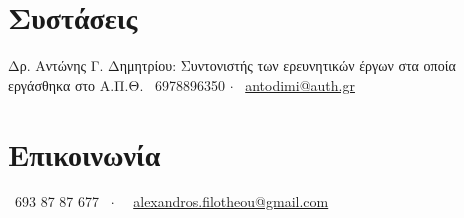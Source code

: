 \documentclass[a4paper,10pt,twoside]{article}
\begin{document}
\section{Συστάσεις}
Δρ. Αντώνης Γ. Δημητρίου: Συντονιστής των ερευνητικών έργων στα οποία εργάσθηκα στο Α.Π.Θ. \hspace{1cm}
\faPhone \ 6978896350 $\cdot$ \faEnvelopeO \ \href{mailto:antodimi@auth.gr}{antodimi@auth.gr} \\


\section{Επικοινωνία}

\begin{center}
  \faPhone \ 693 87 87 677 \ $\cdot$ \ \faEnvelopeO \ \href{mailto:alexandros.filotheou@gmail.com}{alexandros.filotheou@gmail.com}
\end{center}
\end{document}
